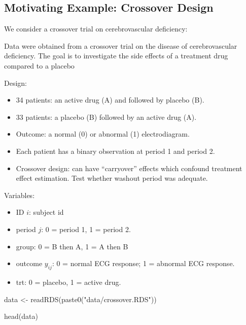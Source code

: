 \documentclass[
  letterpaper,
  DIV=11,
  numbers=noendperiod]{scrreprt}
\newenvironment{Shaded}{\begin{snugshade}}{\end{snugshade}}
\newcommand{\FunctionTok}[1]{\textcolor[rgb]{0.28,0.35,0.67}{#1}}
\newcommand{\NormalTok}[1]{\textcolor[rgb]{0.00,0.23,0.31}{#1}}
\newcommand{\OtherTok}[1]{\textcolor[rgb]{0.00,0.23,0.31}{#1}}
\newcommand{\StringTok}[1]{\textcolor[rgb]{0.13,0.47,0.30}{#1}}
\begin{document}
\hypertarget{motivating-example-crossover-design}{%
\subsection*{Motivating Example: Crossover
Design}\label{motivating-example-crossover-design}}

We consider a crossover trial on cerebrovascular deficiency:

Data were obtained from a crossover trial on the disease of
cerebrovascular deficiency. The goal is to investigate the side effects
of a treatment drug compared to a placebo

Design:

\begin{itemize}
\item
  34 patients: an active drug (A) and followed by placebo (B).
\item
  33 patients: a placebo (B) followed by an active drug (A).
\item
  Outcome: a normal (0) or abnormal (1) electrodiagram.
\item
  Each patient has a binary observation at period 1 and period 2.
\item
  Crossover design: can have ``carryover'' effects which confound
  treatment effect estimation. Test whether washout period was adequate.
\end{itemize}

Variables:

\begin{itemize}
\item
  ID \(i\): subject id
\item
  period \(j\): 0 = period 1, 1 = period 2.
\item
  group: 0 = B then A, 1 = A then B
\item
  outcome \(y_{ij}\): 0 = normal ECG response; 1 = abnormal ECG
  response.
\item
  trt: 0 = placebo, 1 = active drug.
\end{itemize}

\begin{Shaded}
\begin{Highlighting}[]
\NormalTok{data }\OtherTok{\textless{}{-}} \FunctionTok{readRDS}\NormalTok{(}\FunctionTok{paste0}\NormalTok{(}\StringTok{"data/crossover.RDS"}\NormalTok{))}

\FunctionTok{head}\NormalTok{(data)}
\end{Highlighting}
\end{Shaded}
\end{document}
